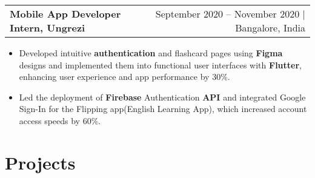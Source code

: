 \documentclass[10pt, legalpaper]{article}
\newenvironment{highlights}{
    \begin{itemize}[
        topsep=0.10 cm,
        parsep=0.10 cm,
        partopsep=0pt,
        itemsep=0pt,
        leftmargin=0 cm + 10pt
    ]
}{
    \end{itemize}
}
\newenvironment{onecolentry}{
    \par\noindent
}{
    \par
}
\begin{document}
\vspace{0.0 cm}

\begin{tabularx}{\textwidth}{@{}Xr@{}}
    \textbf{Mobile App Developer Intern, Ungrezi} & September 2020 – November 2020 | Bangalore, India \\
\end{tabularx}
\vspace{-5mm}
\begin{onecolentry}
    \begin{highlights}
        \item Developed intuitive \textbf{authentication} and flashcard pages using \textbf{Figma} designs and implemented them into functional user interfaces with \textbf{Flutter}, enhancing user experience and app performance by 30\%.
        \item Led the deployment of \textbf{Firebase} Authentication \textbf{API} and integrated Google Sign-In for the Flipping app(English Learning App), which increased account access speeds by 60\%.
    \end{highlights}
\end{onecolentry}

\section{Projects}
\end{document}
